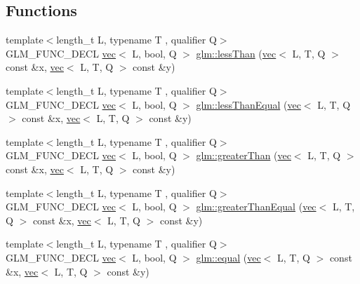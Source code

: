 \subsection*{Functions}
\begin{DoxyCompactItemize}
\item 
{\footnotesize template$<$length\+\_\+t L, typename T , qualifier Q$>$ }\\G\+L\+M\+\_\+\+F\+U\+N\+C\+\_\+\+D\+E\+CL \hyperlink{structglm_1_1vec}{vec}$<$ L, bool, Q $>$ \hyperlink{group__core__func__vector__relational_ga314be073c42278ccb6fe7a7958213824}{glm\+::less\+Than} (\hyperlink{structglm_1_1vec}{vec}$<$ L, T, Q $>$ const \&x, \hyperlink{structglm_1_1vec}{vec}$<$ L, T, Q $>$ const \&y)
\item 
{\footnotesize template$<$length\+\_\+t L, typename T , qualifier Q$>$ }\\G\+L\+M\+\_\+\+F\+U\+N\+C\+\_\+\+D\+E\+CL \hyperlink{structglm_1_1vec}{vec}$<$ L, bool, Q $>$ \hyperlink{group__core__func__vector__relational_ga51bf75522dbe1fa5e7806eb9b825ab6a}{glm\+::less\+Than\+Equal} (\hyperlink{structglm_1_1vec}{vec}$<$ L, T, Q $>$ const \&x, \hyperlink{structglm_1_1vec}{vec}$<$ L, T, Q $>$ const \&y)
\item 
{\footnotesize template$<$length\+\_\+t L, typename T , qualifier Q$>$ }\\G\+L\+M\+\_\+\+F\+U\+N\+C\+\_\+\+D\+E\+CL \hyperlink{structglm_1_1vec}{vec}$<$ L, bool, Q $>$ \hyperlink{group__core__func__vector__relational_gad3a3a7d228da3754c328c9a778f6df56}{glm\+::greater\+Than} (\hyperlink{structglm_1_1vec}{vec}$<$ L, T, Q $>$ const \&x, \hyperlink{structglm_1_1vec}{vec}$<$ L, T, Q $>$ const \&y)
\item 
{\footnotesize template$<$length\+\_\+t L, typename T , qualifier Q$>$ }\\G\+L\+M\+\_\+\+F\+U\+N\+C\+\_\+\+D\+E\+CL \hyperlink{structglm_1_1vec}{vec}$<$ L, bool, Q $>$ \hyperlink{group__core__func__vector__relational_ga271038c5290184127754bda0ae91a5bd}{glm\+::greater\+Than\+Equal} (\hyperlink{structglm_1_1vec}{vec}$<$ L, T, Q $>$ const \&x, \hyperlink{structglm_1_1vec}{vec}$<$ L, T, Q $>$ const \&y)
\item 
{\footnotesize template$<$length\+\_\+t L, typename T , qualifier Q$>$ }\\G\+L\+M\+\_\+\+F\+U\+N\+C\+\_\+\+D\+E\+CL \hyperlink{structglm_1_1vec}{vec}$<$ L, bool, Q $>$ \hyperlink{group__core__func__vector__relational_ga774f9e3a93c913f1e7c215a549707d59}{glm\+::equal} (\hyperlink{structglm_1_1vec}{vec}$<$ L, T, Q $>$ const \&x, \hyperlink{structglm_1_1vec}{vec}$<$ L, T, Q $>$ const \&y)

\end{DoxyCompactItemize}
